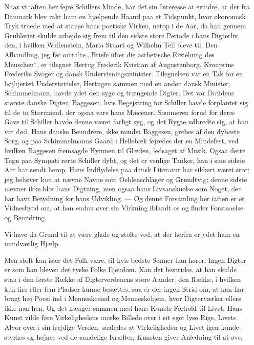 \documentclass[12pt,a4paper,openany]{book}
\newcommand{\opage}[1]{\marginnote{\footnotesize\textit{[#1]}}}
\begin{document}
Naar vi iaften her fejre Schillers Minde, har det sin Interesse
at erindre, at der fra Danmark blev rakt ham en hjælpende
Haand paa et Tidspunkt, hvor økonomisk Tryk truede
med at stanse hans poetiske Virken, netop i de Aar, da han
gennem Grubleriet skulde arbejde sig frem til den sidste store
Periode i hans Digterliv, den, i hvilken Wallenstein, Maria
Stuart og Wilhelm Tell bleve til. Den Afhandling, jeg før omtalte
„Briefe über die ästhetische Erziehung des Menschen“,
\setcounter{footnote}{0}%
\opage{182}er tilegnet Hertug Frederik Kristian af Augustenborg, Kronprins
Frederiks Svoger og dansk Undervisningsminister. Tilegnelsen
var en Tak for en højhjertet Understøttelse, Hertugen sammen
med en anden dansk Minister, Schimmelmann, havde ydet den
syge og trængende Digter. Det var Datidens største danske
Digter, Baggesen, hvis Begejstring for Schiller havde forplantet
sig til de to Stormænd, der ogsaa vare hans Mæcener. Sommeren
forud for deres Gave til Schiller havde denne været
farligt syg, og det Rygte udbredte sig, at han var død. Hans
danske Beundrere, ikke mindst Baggesen, grebes af den dybeste
Sorg, og paa Schimmelmanns Gaard i Hellebæk fejredes
der en Mindefest, ved hvilken Baggesen fremsagde Hymnen til
Glæden, ledsaget af Musik. Ogsaa dette Tegn paa Sympati
rørte Schiller dybt, og det er venlige Tanker, han i sine sidste
Aar har sendt herop. Hans Indflydelse paa dansk Literatur
har sikkert været stor; jeg behøver kun at nævne Navne som
Oehlenschläger og Grundtvig; denne sidste nævner ikke blot
hans Digtning, men ogsaa hans Livsanskuelse som Noget, der
har havt Betydning for hans Udvikling. --- Og denne Forsamling
her iaften er et Vidnesbyrd om, at han endnu øver sin
Virkning iblandt os og finder Forstaaelse og Beundring.

Vi have da Grund til at være glade og stolte ved, at der
herfra er ydet ham en uundværlig Hjælp.

Men stolt kan især det Folk være, til hvis bedste Sønner
han hører. Ingen Digter er som han bleven det tyske Folks
Ejendom. Kan det bestrides, at han skulde staa i den første
Række af Digterverdenens store Aander, den Række, i hvilken
kun fire eller fem Pladser kunne besættes, saa er der ingen
Strid om, at han har bragt høj Poesi ind i Menneskesind og
Menneskehjem, hvor Digterværker ellers ikke naa hen. Og
det hænger sammen med hans Kunsts Forhold til Livet. Hans
Kunst vilde føre Virkelighedens mørke Billede over i sit eget
lyse Rige, Livets Alvor over i sin frejdige Verden, saaledes at
Virkeligheden og Livet igen kunde styrkes og højnes ved de
aandelige Kræfter, Kunsten giver Anledning til at øve.
\end{document}
